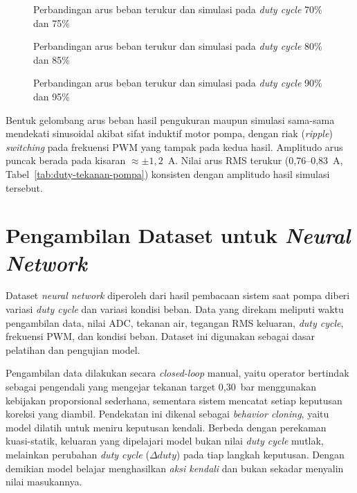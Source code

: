 \begin{figure}[H]
  \centering
  \hfill{}\par\medskip
  \hfill{}
  \caption{Perbandingan arus beban terukur dan simulasi pada \emph{duty cycle}
  70\% dan 75\%}
  \label{fig:banding-i-1}
\end{figure}

\begin{figure}[H]
  \centering
  \hfill{}\par\medskip
  \hfill{}
  \caption{Perbandingan arus beban terukur dan simulasi pada \emph{duty cycle}
  80\% dan 85\%}
  \label{fig:banding-i-2}
\end{figure}

\begin{figure}[H]
  \centering
  \hfill{}\par\medskip
  \hfill{}
  \caption{Perbandingan arus beban terukur dan simulasi pada \emph{duty cycle}
  90\% dan 95\%}
  \label{fig:banding-i-3}
\end{figure}

Bentuk gelombang arus beban hasil pengukuran maupun simulasi sama-sama mendekati
sinusoidal akibat sifat induktif motor pompa, dengan riak (\emph{ripple})
\emph{switching} pada frekuensi PWM yang tampak pada kedua hasil. Amplitudo arus
puncak berada pada kisaran $\approx\pm1,2$~A. Nilai arus RMS terukur
(0,76--0,83~A, Tabel~\ref{tab:duty-tekanan-pompa}) konsisten dengan amplitudo
hasil simulasi tersebut. 

\section{Pengambilan Dataset untuk \emph{Neural Network}}
\label{sec:dataset-neural-network}

Dataset \emph{neural network} diperoleh dari hasil pembacaan sistem saat pompa
diberi variasi \emph{duty cycle} dan variasi kondisi beban. Data yang direkam
meliputi waktu pengambilan data, nilai ADC, tekanan air, tegangan RMS keluaran,
\emph{duty cycle}, frekuensi PWM, dan kondisi beban. Dataset ini digunakan
sebagai dasar pelatihan dan pengujian model.

Pengambilan data dilakukan secara \emph{closed-loop} manual, yaitu operator
bertindak sebagai pengendali yang mengejar tekanan target 0,30~bar menggunakan
kebijakan proporsional sederhana, sementara sistem mencatat setiap keputusan
koreksi yang diambil. Pendekatan ini dikenal sebagai \emph{behavior cloning},
yaitu model dilatih untuk meniru keputusan kendali. Berbeda dengan perekaman
kuasi-statik, keluaran yang dipelajari model bukan nilai \emph{duty cycle}
mutlak, melainkan perubahan \emph{duty cycle} ($\Delta duty$) pada tiap langkah
keputusan. Dengan demikian model belajar menghasilkan \emph{aksi kendali} dan
bukan sekadar menyalin nilai masukannya.

